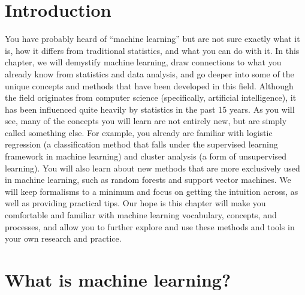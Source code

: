 \documentclass[]{krantz}
\begin{document}
\section{Introduction}\label{introduction-2}

You have probably heard of ``machine learning'' but are not sure exactly
what it is, how it differs from traditional statistics, and what you can
do with it. In this chapter, we will demystify machine learning, draw
connections to what you already know from statistics and data analysis,
and go deeper into some of the unique concepts and methods that have
been developed in this field. Although the field originates from
computer science (specifically, artificial intelligence), it has been
influenced quite heavily by statistics in the past 15 years. As you will
see, many of the concepts you will learn are not entirely new, but are
simply called something else. For example, you already are familiar with
logistic regression (a classification method that falls under the
supervised learning framework in machine learning) and cluster analysis
(a form of unsupervised learning). You will also learn about new methods
that are more exclusively used in machine learning, such as random
forests and support vector machines. We will keep formalisms to a
minimum and focus on getting the intuition across, as well as providing
practical tips. Our hope is this chapter will make you comfortable and
familiar with machine learning vocabulary, concepts, and processes, and
allow you to further explore and use these methods and tools in your own
research and practice.

\section{What is machine learning?}\label{what-is-machine-learning}
\end{document}
